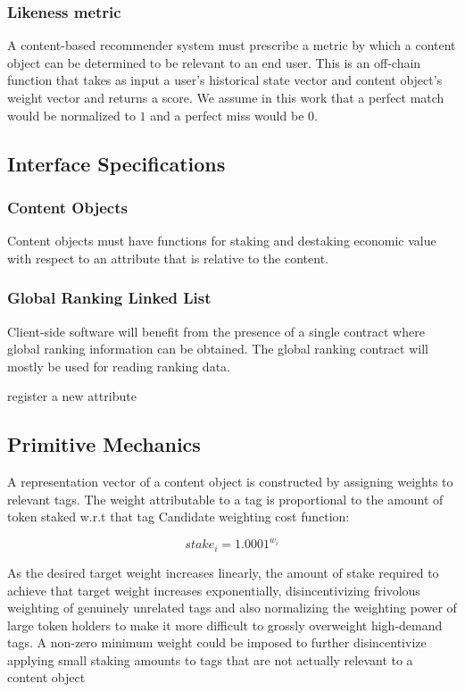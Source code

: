 \subsubsection{Likeness metric}

A content-based recommender system must prescribe a metric by which a content object can be determined to be relevant to an end user. This is an off-chain function that takes as input a user's historical state vector and content object's weight vector and returns a score. We assume in this work that a perfect match would be normalized to $1$ and a perfect miss would be $0$.

\subsection{Interface Specifications}
\label{InterfaceDefinition}

\subsubsection{Content Objects}

Content objects must have functions for staking and destaking economic value with respect to an attribute that is relative to the content. 

\subsubsection{Global Ranking Linked List}

Client-side software will benefit from the presence of a single contract where global ranking information can be obtained. The global ranking contract will mostly be used for reading ranking data. 

register a new attribute

\subsection{Primitive Mechanics}
\label{PrimitiveMechanics}
A representation vector of a content object is constructed by assigning weights to relevant tags. 
The weight attributable to a tag is proportional to the amount of token staked w.r.t that tag
Candidate weighting cost function: 

\begin{equation}
    stake_i = 1.0001^{w_i}
\end{equation}

As the desired target weight increases linearly, the amount of stake required to achieve that target weight increases exponentially, disincentivizing frivolous weighting of genuinely unrelated tags and also normalizing the weighting power of large token holders to make it more difficult to grossly overweight high-demand tags. 
A non-zero minimum weight could be imposed to further disincentivize applying small staking amounts to tags that are not actually relevant to a content object

